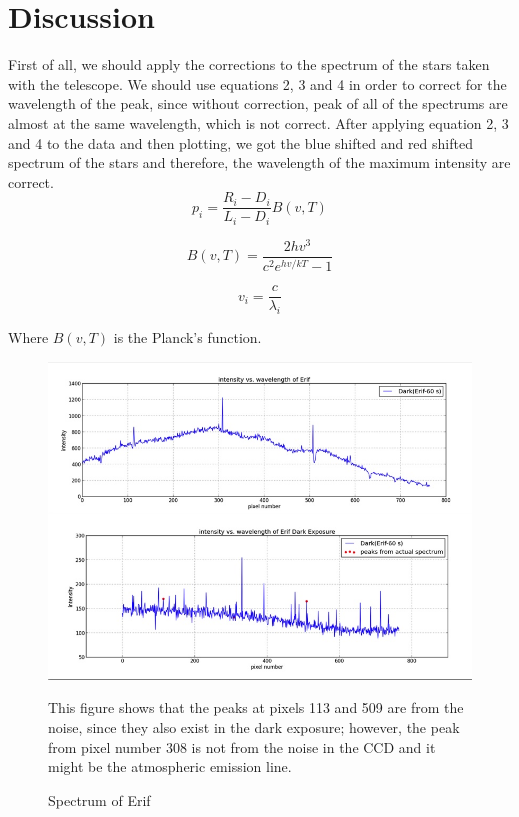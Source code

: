 \documentclass[letterpaper,12pt]{article}
\begin{document}
\section{Discussion}
\label{discussion}
First of all, we should apply the corrections to the spectrum of the stars taken with the telescope. We should use equations 2, 3 and 4 in order to correct for the wavelength of the peak, since without correction, peak of all of the spectrums are almost at the same wavelength, which is not correct. After applying equation 2, 3 and 4 to the data and then plotting, we got the blue shifted and red shifted spectrum of the stars and therefore, the wavelength of the maximum intensity are correct.
\begin{equation}
p_{i}=\frac{R_{i}-D_{i}}{L_{i}-D_{i}}B(v,T)
\end{equation}

\begin{equation}
B(v,T)=\frac{2hv^{3}}{c^{2} e^{hv/kT}-1}
\end{equation}

\begin{equation} v_{i}=\frac{c}{\lambda_{i}} \end{equation}

Where \begin{math}  B(v,T)  \end{math} is the Planck's function. 
\begin{figure}[b!]
\centering
\includegraphics[scale=1.6]{erif_comparison.jpg}
\caption{Spectrum of Erif}
This figure shows that the peaks at pixels 113 and 509 are from the noise, since they also exist in the dark exposure; however, the peak from pixel number 308 is not from the noise in the CCD and it might be the atmospheric emission line.
\end{figure}
\end{document}
